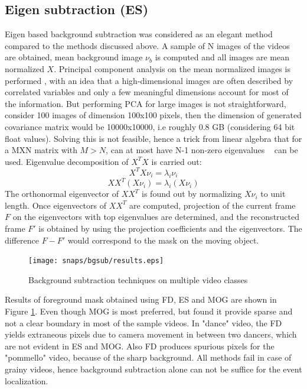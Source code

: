 \subsection{Eigen subtraction (ES)}
Eigen based background subtraction was considered as an elegant method compared to the methods discussed above. A sample of N images of the videos are obtained, mean background image $\nu_b$ is computed and all images are mean normalized  $X$. Principal component analysis on the mean normalized images is performed , with an idea that a high-dimensional images are often described by correlated variables and only a few meaningful dimensions account for most of the information. But performing PCA for large images is not straightforward, consider 100 images of dimension 100x100 pixels, then the dimension of generated covariance matrix would be 10000x10000, i.e roughly 0.8 GB (considering 64 bit float values). Solving this is not feasible, hence a trick from linear algebra that for a MXN matrix with $M>N$, can at most have N-1 non-zero eigenvalues ~\cite{Duda01} can be used. Eigenvalue decomposition of $X^TX$ is carried out:
$$X^TX\nu_i=\lambda_i\nu_i$$
$$XX^T(X\nu_i)=\lambda_i(X\nu_i)$$
The orthonormal eigenvector of $XX^T$ is found out by normalizing $X\nu_i$ to unit length. Once eigenvectors of $XX^T$  are computed, projection of the current frame $F$ on the eigenvectors with top eigenvalues are determined, and the reconstructed frame $F'$ is obtained by using the projection coefficients and the eigenvectors. The difference $F-F'$ would correspond to the mask on the moving object. 

\begin{figure}[htpb]
   \begin{center}
	    \texttt{[image: snaps/bgsub/results.eps]}     
     \caption {Background subtraction techniques on multiple video classes}
   \label{fig:bgsub}
   \end{center}
 \end{figure}
\par Results of foreground mask obtained using FD, ES and MOG are shown in Figure \ref{fig:bgsub}. Even though MOG is most preferred, but found it provide sparse and not a clear boundary in most of the sample videos. In "dance" video, the FD yields extraneous pixels due to camera movement in between two dancers, which are not evident in ES and MOG. Also FD produces spurious pixels for the "pommello" video, because of the sharp background. All methods fail in case of grainy videos, hence background subtraction alone can not be suffice for the event localization.

